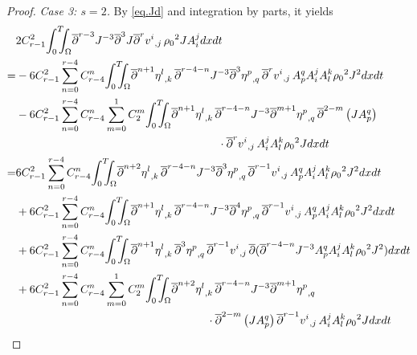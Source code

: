 \documentclass[12pt,twoside,reqno]{amsart}
\numberwithin{equation}{section}
\theoremstyle{definition}
\theoremstyle{remark}
\begin{document}
\begin{proof}
\emph{Case 3: $s=2$.} By \eqref{eq.Jd} and integration by parts, it yields
\begin{align}
  &2C_{r-1}^2 {\int_0^T\!\!\!\!\int_\Omega } {\overline{\partial}}^{r-3} J^{-3}{\overline{\partial}}^3 J {{{{\overline{\partial}}^r v^i}}_{,{j}}\,}{\rho_0}^2 JA^j_i dxdt\label{eq.3b.27}\\
  =&-6C_{r-1}^2 \sum_{n=0}^{r-4}C_{r-4}^n{\int_0^T\!\!\!\!\int_\Omega }{{{{\overline{\partial}}^{n+1}\eta^l}}_{,{k}}\,}{\overline{\partial}}^{r-4-n}J^{-3} {{{{\overline{\partial}}^3\eta^p}}_{,{q}}\,}{{{{\overline{\partial}}^r v^i}}_{,{j}}\,} A^q_p A^j_i A^k_l {\rho_0}^2 J^2dxdt{\nonumber}\\
  &-6C_{r-1}^2\sum_{n=0}^{r-4}C_{r-4}^n \sum_{m=0}^1C_2^m{\int_0^T\!\!\!\!\int_\Omega }{{{{\overline{\partial}}^{n+1}\eta^l}}_{,{k}}\,}{\overline{\partial}}^{r-4-n}J^{-3} {{{{\overline{\partial}}^{m+1}\eta^p}}_{,{q}}\,}{\overline{\partial}}^{2-m}\left( JA^q_p\right){\nonumber}\\
   &\qquad\qquad\qquad\qquad\qquad\qquad\qquad\qquad\qquad\cdot{{{{\overline{\partial}}^r v^i}}_{,{j}}\,} A^j_i A^k_l{\rho_0}^2 J dxdt{\nonumber}\\
  =&6C_{r-1}^2 \sum_{n=0}^{r-4}C_{r-4}^n{\int_0^T\!\!\!\!\int_\Omega }{{{{\overline{\partial}}^{n+2}\eta^l}}_{,{k}}\,}{\overline{\partial}}^{r-4-n}J^{-3} {{{{\overline{\partial}}^3\eta^p}}_{,{q}}\,}{{{{\overline{\partial}}^{r-1} v^i}}_{,{j}}\,} A^q_p A^j_i A^k_l {\rho_0}^2 J^2dxdt\label{eq.3b.28}\\
  &+6C_{r-1}^2 \sum_{n=0}^{r-4}C_{r-4}^n{\int_0^T\!\!\!\!\int_\Omega }{{{{\overline{\partial}}^{n+1}\eta^l}}_{,{k}}\,}{\overline{\partial}}^{r-4-n}J^{-3} {{{{\overline{\partial}}^4\eta^p}}_{,{q}}\,}{{{{\overline{\partial}}^{r-1} v^i}}_{,{j}}\,} A^q_p A^j_i A^k_l {\rho_0}^2 J^2dxdt\label{eq.3b.29}\\
  &+6C_{r-1}^2 \sum_{n=0}^{r-4}C_{r-4}^n{\int_0^T\!\!\!\!\int_\Omega }{{{{\overline{\partial}}^{n+1}\eta^l}}_{,{k}}\,} {{{{\overline{\partial}}^3\eta^p}}_{,{q}}\,}{{{{\overline{\partial}}^{r-1} v^i}}_{,{j}}\,} {\overline{\partial}}({\overline{\partial}}^{r-4-n}J^{-3}A^q_p A^j_i A^k_l {\rho_0}^2 J^2)dxdt\label{eq.3b.30}\\
  &+6C_{r-1}^2\sum_{n=0}^{r-4}C_{r-4}^n \sum_{m=0}^1C_2^m{\int_0^T\!\!\!\!\int_\Omega }{{{{\overline{\partial}}^{n+2}\eta^l}}_{,{k}}\,}{\overline{\partial}}^{r-4-n}J^{-3} {{{{\overline{\partial}}^{m+1}\eta^p}}_{,{q}}\,}\label{eq.3b.31}\\
  &\qquad\qquad\qquad\qquad\qquad\qquad\qquad\qquad\quad\cdot{\overline{\partial}}^{2-m}\left( JA^q_p\right) {{{{\overline{\partial}}^{r-1} v^i}}_{,{j}}\,} A^j_i A^k_l{\rho_0}^2 J dxdt{\nonumber}\\

\end{align}
\end{proof}
\end{document}
